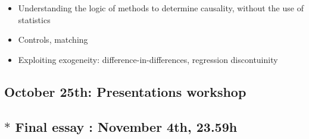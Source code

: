 \documentclass[12pt, a4paper]{article}
\begin{document}
\begin{itemize}
\setlength\itemsep{-5pt}
  \item Understanding the logic of methods to determine causality, without the use of statistics
  \item Controls, matching
  \item Exploiting exogeneity: difference-in-differences, regression discontuinity
\end{itemize}

\subsection*{October 25th: Presentations workshop}


\subsection*{$*$ Final essay {\color{red}{deadline}}: November 4th, 23.59h}
\end{document}
